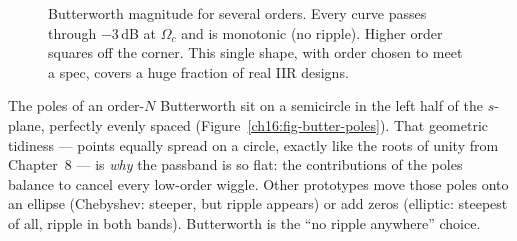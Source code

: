 \begin{figure}[H]
\centering
{}
\caption{Butterworth magnitude for several orders. Every curve passes through
$-3$\,dB at $\Omega_c$ and is monotonic (no ripple). Higher order squares off the
corner. This single shape, with order chosen to meet a spec, covers a huge
fraction of real IIR designs.}
\label{ch16:fig-butter}
\end{figure}

\begin{intuitionbox}
The poles of an order-$N$ Butterworth sit on a semicircle in the left half of the
$s$-plane, perfectly evenly spaced (Figure~\ref{ch16:fig-butter-poles}). That geometric tidiness --- points equally
spread on a circle, exactly like the roots of unity from Chapter~8 --- is
\emph{why} the passband is so flat: the contributions of the poles balance to
cancel every low-order wiggle. Other prototypes move those poles onto an ellipse
(Chebyshev: steeper, but ripple appears) or add zeros (elliptic: steepest of all,
ripple in both bands). Butterworth is the ``no ripple anywhere'' choice.
\end{intuitionbox}

